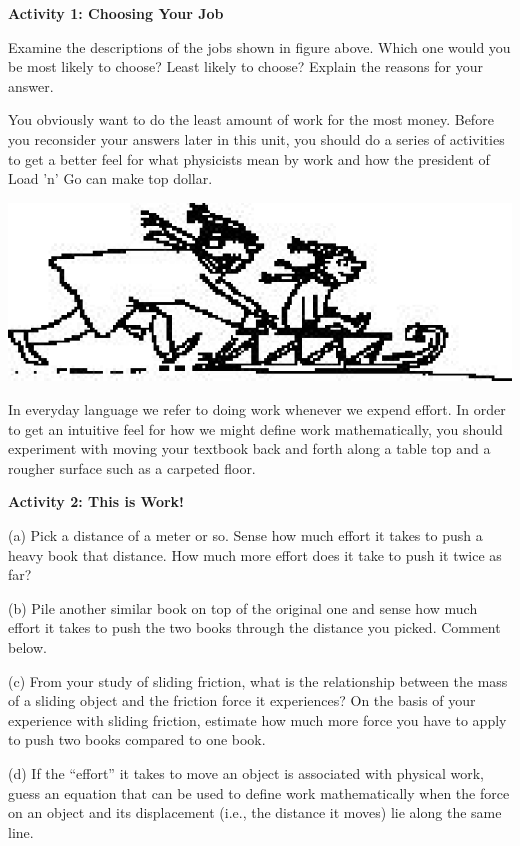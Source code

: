 \textbf{Activity 1: Choosing Your Job }

Examine the descriptions of the jobs shown in figure above. Which one would
you be most likely to choose? Least likely to choose? Explain the reasons for
your answer.
\answerspace{30mm}

You obviously want to do the least amount of work for the most money. Before
you reconsider your answers later in this unit, you should do a series of activities
to get a better feel for what physicists mean by work and how the president
of Load 'n' Go can make top dollar.

\vspace{0.3cm}
{\par\centering \includegraphics{work_power/work_power_fig2.eps} \par}
\vspace{0.3cm}

In everyday language we refer to doing work whenever we expend effort. In order
to get an intuitive feel for how we might define work mathematically, you should
experiment with moving your textbook back and forth along a table top and a
rougher surface such as a carpeted floor.

\textbf{Activity 2: This is Work!} 

(a) Pick a distance of a meter or so. Sense how much effort it takes to push
a heavy book that distance. How much more effort does it take to push it twice
as far? 
\answerspace{20mm}

(b) Pile another similar book on top of the original one and sense how much
effort it takes to push the two books through the distance you picked. Comment
below.
\answerspace{20mm}

(c) From your study of sliding friction, what is the relationship between the
mass of a sliding object and the friction force it experiences? On the basis
of your experience with sliding friction, estimate how much more force you have
to apply to push two books compared to one book.
\answerspace{20mm}

(d) If the ``effort'' it takes to move an object is associated
with physical work, guess an equation that can be used to define work mathematically
when the force on an object and its displacement (i.e., the distance it moves)
lie along the same line.
\answerspace{20mm}

